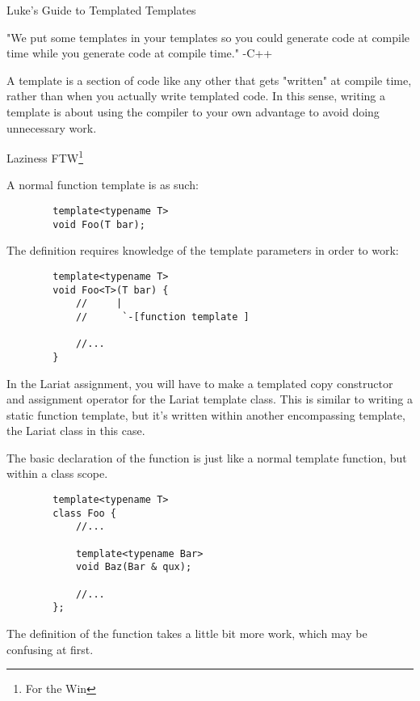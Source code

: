 \begin{section}{Luke's Guide to Templated Templates}

 \begin{displayquote}
	 "We put some templates in your templates so you could generate code at compile
	 time while you generate code at compile time."
	 -C++
 \end{displayquote}

 \indent A template is a section of code like any other that gets "written" at compile
 time, rather than when you actually write templated code. In this sense,
 writing a template is about using the compiler to your own advantage to avoid
 doing unnecessary work.

 \begin{displayquote}
	 Laziness FTW\footnote{For the Win}
 \end{displayquote}


 A normal function template is  as such:
 \begin{verbatim}
		template<typename T>
		void Foo(T bar);
	\end{verbatim}

 The definition requires knowledge of the template parameters in order to work:

 \begin{verbatim}
		template<typename T>
		void Foo<T>(T bar) {
			//     |
			//      `-[function template ]

			//...
		}
	\end{verbatim}

 \indent In the Lariat assignment, you will have to make a templated copy constructor
 and assignment operator for the Lariat template class. This is similar to
 writing a static function template, but it's written within another
 encompassing template, the Lariat class in this case.

 \indent The basic declaration of the function is just like a normal template
 function, but within a class scope.

 \begin{verbatim}
		template<typename T>
		class Foo {
			//...

			template<typename Bar>
			void Baz(Bar & qux);

			//...
		};
	\end{verbatim}

 \pagebreak
 \indent The definition of the function takes a little bit more work, which may be confusing at first.



\end{section}
